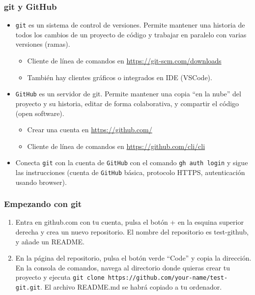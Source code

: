 \documentclass[mathserif, 10pt]{beamer}
\begin{document}
\begin{frame}\frametitle{git y GitHub}

    \begin{itemize}
        \item \texttt{git} es un sistema de control de versiones. Permite mantener una historia de todos los cambios de un proyecto de código y trabajar en paralelo con varias versiones (ramas).
              \begin{itemize}
                  \item Cliente de línea de comandos en \url{https://git-scm.com/downloads}
                  \item También hay clientes gráficos o integrados en IDE (VSCode).
              \end{itemize}
        \item \texttt{GitHub} es un servidor de git. Permite mantener una copia ``en la nube'' del proyecto y su historia, editar de forma colaborativa, y compartir el código (open software).
              \begin{itemize}
                  \item Crear una cuenta en \url{https://github.com/}
                  \item Cliente de línea de comandos en \url{https://github.com/cli/cli}
              \end{itemize}
        \item Conecta \texttt{git} con la cuenta de \texttt{GitHub} con el comando \texttt{gh auth login} y sigue las instrucciones (cuenta de \texttt{GitHub} básica, protocolo HTTPS, autenticación usando browser).
    \end{itemize}
\end{frame}

\begin{frame}\frametitle{Empezando con git}
    \begin{enumerate}
        \item Entra en github.com con tu cuenta, pulsa el botón + en la esquina superior derecha y crea un nuevo repositorio. El nombre del repositorio es test-github, y añade un README.
        \item En la página del repositorio, pulsa el botón verde ``Code'' y copia la dirección. En la consola de comandos, navega al directorio donde quieras crear tu proyecto y ejecuta \texttt{git clone https://github.com/your-name/test-git.git}. El archivo README.md se habrá copiado a tu ordenador.
\end{enumerate}
\end{frame}
\end{document}
